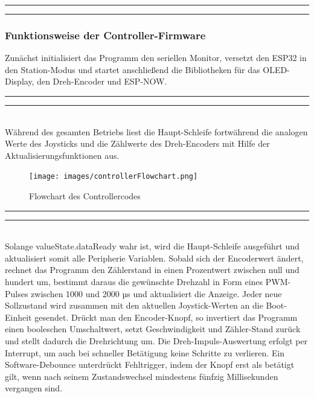 \documentclass[a4paper,12pt]{article}
\begin{document}
\noindent\rule{\linewidth}{0.4pt}  %



\noindent\rule{\linewidth}{0.4pt} %



\subsubsection{Funktionsweise der Controller-Firmware}

Zunächst initialisiert das Programm den seriellen Monitor, versetzt den ESP32 in den Station-Modus und startet anschließend die Bibliotheken für das OLED-Display, den Dreh-Encoder und ESP-NOW. 

\newpage
\noindent\rule{\linewidth}{0.4pt}  %

\noindent\rule{\linewidth}{0.4pt}\\[0.5em]  %
Während des gesamten Betriebs liest die Haupt-Schleife fortwährend die analogen Werte des Joysticks und die Zählwerte des Dreh-Encoders mit Hilfe der Aktualisierungsfunktionen aus. 

\begin{figure}[H]
    \centering
    \texttt{[image: images/controllerFlowchart.png]}
    \caption{Flowchart des Controllercodes}
    \label{Controlller-Flowchart}
\end{figure}

\newpage
\noindent\rule{\linewidth}{0.4pt}  %

\noindent\rule{\linewidth}{0.4pt}\\[0.5em]  %
Solange valueState.dataReady wahr ist, wird die Haupt-Schleife ausgeführt und aktualisiert somit alle Peripherie Variablen. Sobald sich der Encoderwert ändert, rechnet das Programm den Zählerstand in einen Prozentwert zwischen null und hundert um, bestimmt daraus die gewünschte Drehzahl in Form eines PWM-Pulses zwischen 1000 und 2000 µs und aktualisiert die Anzeige. Jeder neue Sollzustand wird zusammen mit den aktuellen Joystick-Werten an die Boot-Einheit gesendet. Drückt man den Encoder-Knopf, so invertiert das Programm einen booleschen Umschaltwert, setzt Geschwindigkeit und Zähler-Stand zurück und stellt dadurch die Drehrichtung um. Die Dreh-Impuls-Auswertung erfolgt per Interrupt, um auch bei schneller Betätigung keine Schritte zu verlieren. Ein Software-Debounce unterdrückt Fehltrigger, indem der Knopf erst als betätigt gilt, wenn nach seinem Zustandswechsel mindestens fünfzig Millisekunden vergangen sind.
\end{document}
